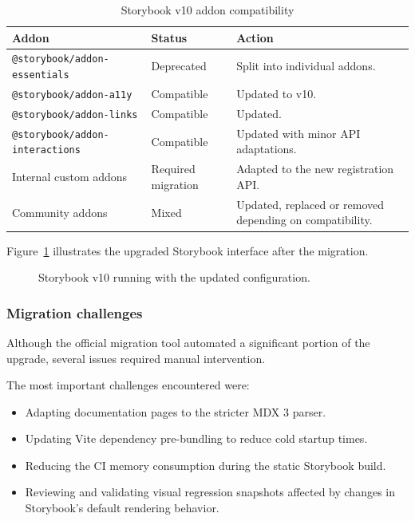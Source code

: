 \begin{table}[h]
    \centering
    \caption{Storybook v10 addon compatibility}
    \label{tab:addon-compat}
    \begin{tabularx}{\textwidth}{@{}l l X@{}}
        \toprule
        \textbf{Addon} & \textbf{Status} & \textbf{Action} \\
        \midrule
        \texttt{@storybook/addon-essentials} & Deprecated & Split into individual addons. \\
        \texttt{@storybook/addon-a11y} & Compatible & Updated to v10. \\
        \texttt{@storybook/addon-links} & Compatible & Updated. \\
        \texttt{@storybook/addon-interactions} & Compatible & Updated with minor API adaptations. \\
        Internal custom addons & Required migration & Adapted to the new registration API. \\
        Community addons & Mixed & Updated, replaced or removed depending on compatibility. \\
        \bottomrule
    \end{tabularx}
\end{table}

Figure~\ref{fig:storybook-v10} illustrates the upgraded Storybook interface after the migration.

\begin{figure}[H]
    \centering
    \caption{Storybook v10 running with the updated configuration.}
    \label{fig:storybook-v10}
\end{figure}

\subsubsection{Migration challenges}

Although the official migration tool automated a significant portion of the upgrade, several issues required manual intervention.

The most important challenges encountered were:

\begin{itemize}
    \item Adapting documentation pages to the stricter MDX 3 parser.
    \item Updating Vite dependency pre-bundling to reduce cold startup times.
    \item Reducing the CI memory consumption during the static Storybook build.
    \item Reviewing and validating visual regression snapshots affected by changes in Storybook's default rendering behavior.
\end{itemize}

